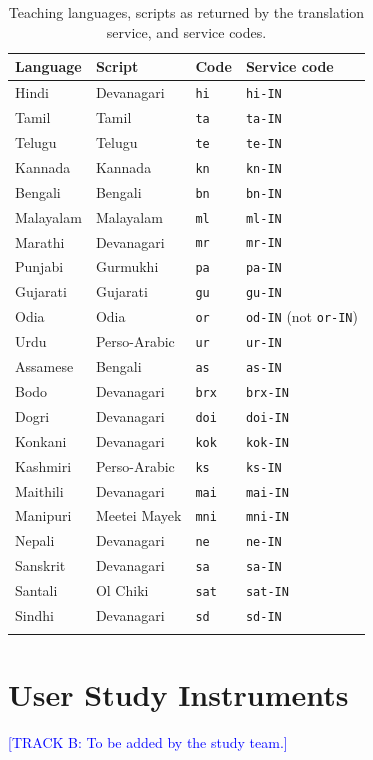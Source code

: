 \documentclass[pdflatex,sn-mathphys-num]{sn-jnl}%
\newcommand{\trackb}[1]{\textcolor{blue}{[TRACK B: #1]}}
\theoremstyle{thmstyleone}%
\theoremstyle{thmstyletwo}%
\theoremstyle{thmstylethree}%
\begin{document}
\begin{appendices}
\begin{table}[h]
\caption{Teaching languages, scripts as returned by the translation service, and service codes.}\label{tab:language-codes}
\footnotesize
\begin{tabular*}{\textwidth}{@{\extracolsep\fill}llll}
\toprule
Language & Script & Code & Service code \\
\midrule
Hindi & Devanagari & \texttt{hi} & \texttt{hi-IN} \\
Tamil & Tamil & \texttt{ta} & \texttt{ta-IN} \\
Telugu & Telugu & \texttt{te} & \texttt{te-IN} \\
Kannada & Kannada & \texttt{kn} & \texttt{kn-IN} \\
Bengali & Bengali & \texttt{bn} & \texttt{bn-IN} \\
Malayalam & Malayalam & \texttt{ml} & \texttt{ml-IN} \\
Marathi & Devanagari & \texttt{mr} & \texttt{mr-IN} \\
Punjabi & Gurmukhi & \texttt{pa} & \texttt{pa-IN} \\
Gujarati & Gujarati & \texttt{gu} & \texttt{gu-IN} \\
Odia & Odia & \texttt{or} & \texttt{od-IN} (not \texttt{or-IN}) \\
Urdu & Perso-Arabic & \texttt{ur} & \texttt{ur-IN} \\
Assamese & Bengali & \texttt{as} & \texttt{as-IN} \\
Bodo & Devanagari & \texttt{brx} & \texttt{brx-IN} \\
Dogri & Devanagari & \texttt{doi} & \texttt{doi-IN} \\
Konkani & Devanagari & \texttt{kok} & \texttt{kok-IN} \\
Kashmiri & Perso-Arabic & \texttt{ks} & \texttt{ks-IN} \\
Maithili & Devanagari & \texttt{mai} & \texttt{mai-IN} \\
Manipuri & Meetei Mayek & \texttt{mni} & \texttt{mni-IN} \\
Nepali & Devanagari & \texttt{ne} & \texttt{ne-IN} \\
Sanskrit & Devanagari & \texttt{sa} & \texttt{sa-IN} \\
Santali & Ol Chiki & \texttt{sat} & \texttt{sat-IN} \\
Sindhi & Devanagari & \texttt{sd} & \texttt{sd-IN} \\
\botrule
\end{tabular*}
\end{table}

\section{User Study Instruments}\label{app:instruments}

\trackb{To be added by the study team.}

\end{appendices}


\end{document}
